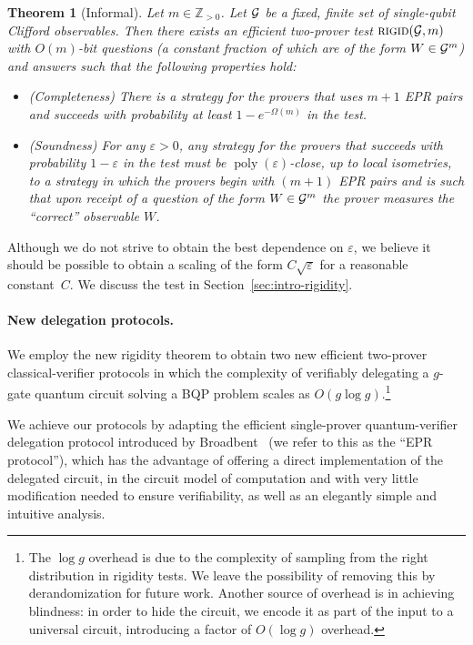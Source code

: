 \documentclass[11pt]{article}
\newtheorem{theorem}{Theorem}
\DeclareMathOperator{\poly}{poly}
\newcommand{\eps}{\varepsilon}
\begin{document}
\begin{theorem}[Informal]\label{thm:rigid-informal}
Let $m\in\mathbb{Z}_{>0}$. Let $\cal G$ be a fixed, finite set of single-qubit Clifford observables. Then there exists an efficient two-prover test $\textsc{rigid}({\cal G},m)$ with $O(m)$-bit questions (a constant fraction of which are of the form $W\in{\cal G}^m$) and answers such that the following properties hold:
\begin{itemize}[nolistsep]
\item (Completeness) There is a strategy for the provers that uses $m+1$ EPR pairs and succeeds with probability at least $1 - e^{-\Omega(m)}$ in the test.
\item (Soundness) For any $\eps>0$, any strategy for the provers that succeeds with probability $1-\eps$ in the test must be $\poly(\eps)$-close, up to local isometries, to a strategy in which the provers begin with $(m+1)$ EPR pairs and is such that upon receipt of a question of the form $W\in {\cal G}^m$ the prover measures the ``correct'' observable $W$. 
\end{itemize}
\end{theorem}

Although we do not strive to obtain the best dependence on $\eps$, we believe it
should be possible to obtain a scaling of the form $C\sqrt{\eps}$ for a
reasonable constant~$C$. We discuss the test in Section~\ref{sec:intro-rigidity}. %


\paragraph{New delegation protocols.}
We employ the new rigidity theorem to obtain two new efficient
two-prover classical-verifier protocols in which the complexity of verifiably
delegating a $g$-gate quantum circuit solving a BQP problem scales as $O(g\log g)$.\footnote{The $\log
g$ overhead is due to the complexity of sampling from the right distribution in
rigidity tests. We leave the possibility of removing this by derandomization for
future work. Another source of overhead is in achieving blindness: in order to
hide the circuit, we encode it as part of the input to a universal circuit,
introducing a factor of $O(\log g)$ overhead.} 

We achieve our protocols by adapting the efficient single-prover quantum-verifier delegation
protocol introduced by Broadbent~\cite{broadbent15howtoverify} (we refer to this as the ``EPR protocol''), which has the advantage of offering a direct implementation of the delegated circuit, in the circuit model of computation and with very little modification needed to ensure verifiability, as well as an elegantly simple and intuitive analysis. 
 
\end{document}
